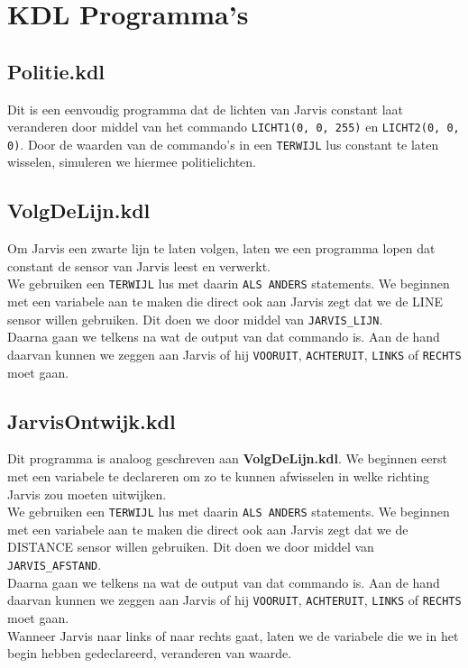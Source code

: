 \documentclass[a4paper]{article}
\begin{document}
\section{KDL Programma's}
\subsection{Politie.kdl}
Dit is een eenvoudig programma dat de lichten van Jarvis constant laat veranderen door middel van het commando \verb|LICHT1(0, 0, 255)| en \verb|LICHT2(0, 0, 0)|. Door de waarden van de commando's in een \verb|TERWIJL| lus constant te laten wisselen, simuleren we hiermee politielichten.

\subsection{VolgDeLijn.kdl}
Om Jarvis een zwarte lijn te laten volgen, laten we een programma lopen dat constant de sensor van Jarvis leest en verwerkt. \\
We gebruiken een \verb|TERWIJL| lus met daarin  \verb|ALS ANDERS| statements. We beginnen met een variabele aan te maken die direct ook aan Jarvis zegt dat we de LINE sensor willen gebruiken. Dit doen we door middel van \verb|JARVIS_LIJN|.  \\
Daarna gaan we telkens na wat de output van dat commando is. Aan de hand daarvan kunnen we zeggen aan Jarvis of hij \verb|VOORUIT|, \verb|ACHTERUIT|, \verb|LINKS| of \verb|RECHTS| moet gaan.

\subsection{JarvisOntwijk.kdl}
Dit programma is analoog geschreven aan \textbf{VolgDeLijn.kdl}. We beginnen eerst met een variabele te declareren om zo te kunnen afwisselen in welke richting Jarvis zou moeten uitwijken. \\
We gebruiken een \verb|TERWIJL| lus met daarin  \verb|ALS ANDERS| statements. We beginnen met een variabele aan te maken die direct ook aan Jarvis zegt dat we de DISTANCE sensor willen gebruiken. Dit doen we door middel van \verb|JARVIS_AFSTAND|. \\
Daarna gaan we telkens na wat de output van dat commando is. Aan de hand daarvan kunnen we zeggen aan Jarvis of hij \verb|VOORUIT|, \verb|ACHTERUIT|, \verb|LINKS| of \verb|RECHTS| moet gaan. \\
Wanneer Jarvis naar links of naar rechts gaat, laten we de variabele die we in het begin hebben gedeclareerd, veranderen van waarde.
\end{document}
